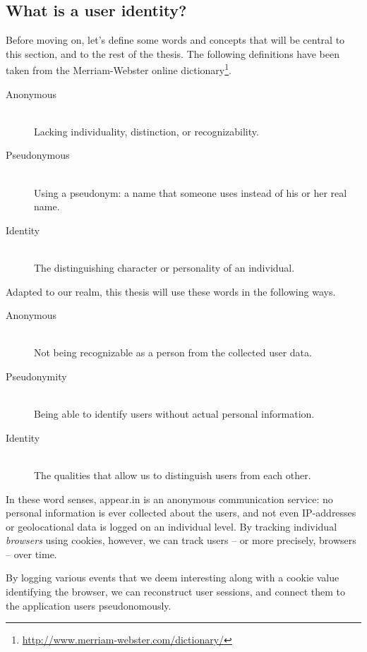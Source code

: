   \subsection{What is a user identity?}
  \label{survey:identity}

    Before moving on, let's define some words and concepts that will be central to this section, and to the rest of the thesis. The following definitions have been taken from the Merriam-Webster online dictionary\footnote{\url{http://www.merriam-webster.com/dictionary/}}.

    \begin{description}
      \item[Anonymous] \hfill \\
        Lacking individuality, distinction, or recognizability.
      \item[Pseudonymous] \hfill \\
        Using a pseudonym: a name that someone uses instead of his or her real name.
      \item[Identity] \hfill \\
        The distinguishing character or personality of an individual.
    \end{description}

    Adapted to our realm, this thesis will use these words in the following ways.

    \begin{description}
      \item[Anonymous] \hfill \\
        Not being recognizable as a person from the collected user data.
      \item[Pseudonymity] \hfill \\
        Being able to identify users without actual personal information.
      \item[Identity] \hfill \\
        The qualities that allow us to distinguish users from each other.
    \end{description}

    In these word senses, appear.in is an anonymous communication service: no personal information is ever collected about the users, and not even IP-addresses or geolocational data is logged on an individual level. By tracking individual \emph{browsers} using cookies, however, we can track users -- or more precisely, browsers -- over time.

    By logging various events that we deem interesting along with a cookie value identifying the browser, we can reconstruct user sessions, and connect them to the application users pseudonomously.

